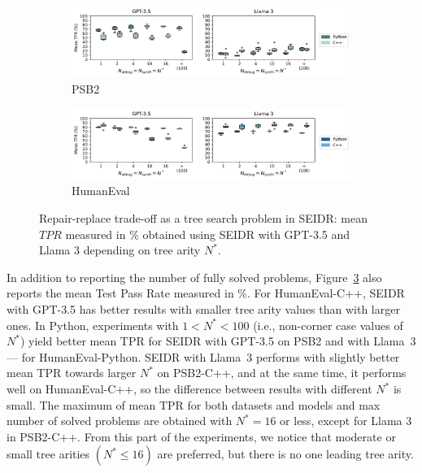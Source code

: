\begin{figure}
\begin{subfigure}{\linewidth}
\centering
\includegraphics[width=\linewidth, trim={0mm 0mm 0mm 0mm}]{images/mean_tpr_psb2_6runs_boxplot_v5.pdf}
  \caption{PSB2}
  \label{fig:mean-tpr-psb2-gpt3.5}
\end{subfigure}
\begin{subfigure}{\columnwidth}
\centering
\includegraphics[width=\linewidth, trim={0mm 0mm 0mm 0mm}]{images/mean_tpr_humaneval_6runs_boxplot_v5.pdf}
  \caption{HumanEval}
  \label{fig:mean-tpr-he-gpt3.5}
\end{subfigure}
\caption{Repair-replace trade-off as a tree search problem in SEIDR: mean $TPR$ measured in \% obtained using SEIDR with GPT-3.5 and Llama 3 depending on tree arity $N^*$.}
\label{fig:mean-tpr-repair-replace-trade-off-generalizability}
\end{figure}


In addition to reporting the number of fully solved problems, Figure~\ref{fig:mean-tpr-repair-replace-trade-off-generalizability} also reports the mean Test Pass Rate measured in \%. 
For HumanEval-C++, SEIDR with GPT-3.5 has better results with smaller tree arity values than with larger ones.
In Python, experiments with $1 < N^* < 100$ (i.e., non-corner case values of $N^*$) yield better mean TPR for SEIDR with GPT-3.5 on PSB2 and with Llama~3 --- for HumanEval-Python.
SEIDR with Llama~3 performs with slightly better mean TPR towards larger $N^*$  on PSB2-C++, and at the same time, it performs well on HumanEval-C++, so the difference between results with different $N^*$ is small.
The maximum of mean TPR for both datasets and models and max number of solved problems are obtained with $N^*=16$ or less, except for Llama 3 in PSB2-C++. 
From this part of the experiments, we notice that moderate or small tree arities $(N^* \le 16)$ are preferred, but there is no one leading tree arity.


